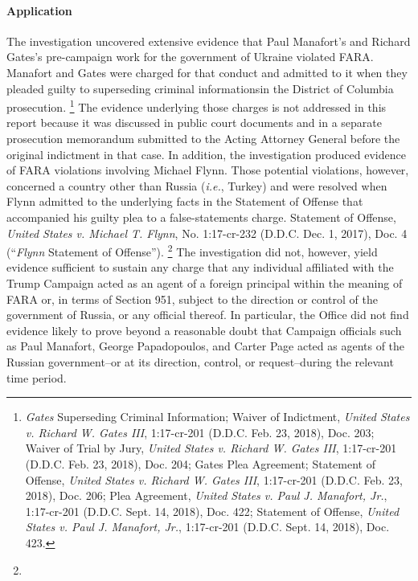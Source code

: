 \paragraph{Application}
The investigation uncovered extensive evidence that Paul Manafort's and Richard Gates's pre-campaign work for the government of Ukraine violated FARA.
Manafort and Gates were charged for that conduct and admitted to it when they pleaded guilty to superseding criminal informationsin the District of Columbia prosecution.%
\footnote{\textit{Gates} Superseding Criminal Information;
Waiver of Indictment, \textit{United States v. Richard W. Gates III}, 1:17-cr-201 (D.D.C. Feb. 23, 2018), Doc. 203;
Waiver of Trial by Jury, \textit{United States v. Richard W. Gates III}, 1:17-cr-201 (D.D.C. Feb. 23, 2018), Doc. 204;
Gates Plea Agreement;
Statement of Offense, \textit{United States v. Richard W. Gates III}, 1:17-cr-201 (D.D.C. Feb. 23, 2018), Doc. 206;
Plea Agreement, \textit{United States v. Paul J. Manafort, Jr.}, 1:17-cr-201 (D.D.C. Sept. 14, 2018), Doc. 422;
Statement of Offense, \textit{United States v. Paul J. Manafort, Jr.}, 1:17-cr-201 (D.D.C. Sept. 14, 2018), Doc. 423.}
The evidence underlying those charges is not addressed in this report because it was discussed in public court documents and in a separate prosecution memorandum submitted to the Acting Attorney General before the original indictment in that case.
In addition, the investigation produced evidence of FARA violations involving Michael Flynn.
Those potential violations, however, concerned a country other than Russia (\textit{i.e.}, Turkey) and were resolved when Flynn admitted to the underlying facts in the Statement of Offense that accompanied his guilty plea to a false-statements charge.
Statement of Offense, \textit{United States v. Michael T. Flynn}, No. 1:17-cr-232 (D.D.C. Dec. 1, 2017), Doc. 4 (``\textit{Flynn} Statement of Offense'').%
\footnote{}
The investigation did not, however, yield evidence sufficient to sustain any charge that any individual affiliated with the Trump Campaign acted as an agent of a foreign principal within the meaning of FARA or, in terms of Section 951, subject to the direction or control of the government of Russia, or any official thereof.
In particular, the Office did not find evidence likely to prove beyond a reasonable doubt that Campaign officials such as Paul Manafort, George Papadopoulos, and Carter Page acted as agents of the Russian government--or at its direction, control, or request--during the relevant time period.%
